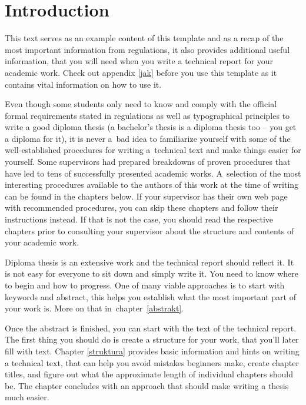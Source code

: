 
% 

\chapter{Introduction}

This text serves as an example content of this template and as a recap of the most important information from regulations, it also provides additional useful information, that you will need when you write a technical report for your academic work. Check out appendix \ref{jak} before you use this template as it contains vital information on how to use it.

Even though some students only need to know and comply with the official formal requirements stated in regulations as well as typographical principles to write a good diploma thesis (a bachelor's thesis is a diploma thesis too -- you get a diploma for it), it is never a~bad idea to familiarize yourself with some of the well-established procedures for writing a~technical text and make things easier for yourself. Some supervisors had prepared breakdowns of proven procedures that have led to tens of successfully presented academic works. A~selection of the most interesting procedures available to the authors of this work at the time of writing can be found in the chapters below. If your supervisor has their own web page with recommended procedures, you can skip these chapters and follow their instructions instead. If that is not the case, you should read the respective chapters prior to consulting your supervisor about the structure and contents of your academic work.

Diploma thesis is an extensive work and the technical report should reflect it. It is not easy for everyone to sit down and simply write it. You need to know where to begin and how to progress. One of many viable approaches is to start with keywords and abstract, this helps you establish what the most important part of your work is. More on that in~chapter~\ref{abstrakt}.

Once the abstract is finished, you can start with the text of the technical report. The first thing you should do is create a structure for your work, that you'll later fill with text. Chapter \ref{struktura} provides basic information and hints on writing a technical text, that can help you avoid mistakes beginners make, create chapter titles, and figure out what the approximate length of individual chapters should be. The chapter concludes with an approach that should make writing a thesis much easier.

